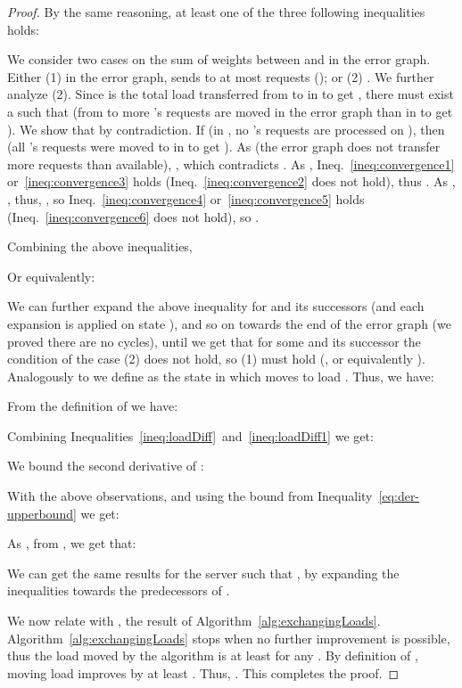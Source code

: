 \documentclass[11pt]{article}
\begin{document}
\begin{proof}
By the same reasoning, at least one of the three following inequalities holds:




We consider two 
cases on the sum of weights between  and  in the error graph.
Either (1) in the error graph,  sends to  at most  requests (); or (2) 
. We further analyze (2). Since  is the total load transferred from  to  in  to get , there must exist a  such that  (from  to  more 's requests are moved in the error graph than in  to get ). 
We show that  by contradiction. 
If  (in , 
no 's requests are processed on ), 
then  
(all 's requests were moved to  in  to get ).
As  (the error graph does not transfer more requests than available),
, which contradicts .
As ,
Ineq.~\ref{ineq:convergence1} or~\ref{ineq:convergence3} holds (Ineq.~\ref{ineq:convergence2} does not hold),
thus .
As ,
,
thus, ,
so Ineq.~\ref{ineq:convergence4} or~\ref{ineq:convergence5} holds (Ineq.~\ref{ineq:convergence6} does not hold),
so .


Combining the above inequalities,

Or equivalently:


We can further expand the above inequality for  and its successors (and each expansion is applied on state ), and so on towards the end of the error graph (we proved there are no cycles), until we get that for some  and its successor  the condition of the case (2) does not hold, so (1) must hold (, or equivalently ). 
Analogously to  we define  as the state in which  moves to  load .
Thus, we have:

From the definition of  we have:

Combining Inequalities~\ref{ineq:loadDiff}~and~\ref{ineq:loadDiff1} we get:

We bound the second derivative of :

With the above observations, and using the bound from Inequality~\ref{eq:der-upperbound} we get: 

As , from , we get that:


We can get the same results for the server  such that , by expanding the inequalities towards the predecessors of .

We now relate  with , the result of Algorithm~\ref{alg:exchangingLoads}. Algorithm~\ref{alg:exchangingLoads} stops when no further improvement is possible, thus the load moved by the algorithm is at least  for any . By definition of , moving  load improves  by at least . Thus, 
. 
This completes the proof.
\end{proof}
\end{document}
